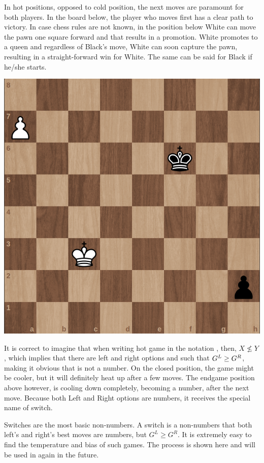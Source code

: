 In hot positions, opposed to cold position, the next moves are paramount for both players. In the board below, the player who moves first has a clear path to victory. In case chess rules are not known, in the position below White can move the pawn one square forward and that results in a promotion. White promotes to a queen and regardless of Black's move, White can soon capture the pawn, resulting in a straight-forward win for White. The same can be said for Black if he/she starts.

\begin{center}
	\includegraphics[scale=0.15]{images/chess_hot} 
\end{center}

It is correct to imagine that when writing hot game \Gm{} in the notation , then, $X \nleq Y$, which implies that there are left and right options  and  such that $\mbox{$G^L$} \ge \mbox{$G^R$}$, making it obvious that \Gm{} is not a number. On the closed position, the game might be cooler, but it will definitely heat up after a few moves. The endgame position above however, is cooling down completely, becoming a number, after the next move. Because both Left and Right options are numbers, it receives the special name of switch.

Switches are the most basic non-numbers. A switch is a non-numbers \Gm{} that both left's and right's best moves are numbers, but $G^L \ge G^R$. It is extremely easy to find the temperature and bias of such games. The process is shown here and will be used in again in the future.


